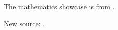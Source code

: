 \documentclass{article}
\begin{document}
The mathematics showcase is from \citet{Graham1995}.

New source: \citep{TestBook2026}.

\citep{MissingSource}



\end{document}
